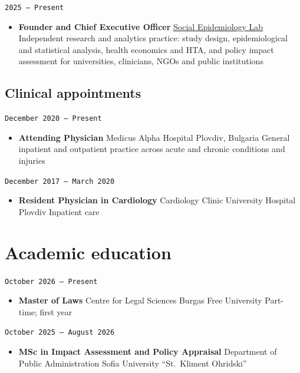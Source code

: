 \documentclass[
  10.5pt,
  a4paper,
  DIV=11,
  numbers=noendperiod]{scrartcl}
\providecommand{\tightlist}{%
  \setlength{\itemsep}{0pt}\setlength{\parskip}{0pt}}
\let\oldtexttt\texttt
\renewcommand{\texttt}[1]{{\color{cvbronze}\small\oldtexttt{#1}}}
\begin{document}
\texttt{2025\ –\ Present}

\begin{itemize}
\tightlist
\item
  \textbf{Founder and Chief Executive Officer} \textbar{}
  \href{lab.qmd}{Social Epidemiology Lab} \textbar{} Independent
  research and analytics practice: study design, epidemiological and
  statistical analysis, health economics and HTA, and policy impact
  assessment for universities, clinicians, NGOs and public institutions
\end{itemize}

\subsection{Clinical appointments}\label{clinical-appointments}

\texttt{December\ 2020\ –\ Present}

\begin{itemize}
\tightlist
\item
  \textbf{Attending Physician} \textbar{} Medicus Alpha Hospital
  \textbar{} Plovdiv, Bulgaria \textbar{} General inpatient and
  outpatient practice across acute and chronic conditions and injuries
\end{itemize}

\texttt{December\ 2017\ –\ March\ 2020}

\begin{itemize}
\tightlist
\item
  \textbf{Resident Physician in Cardiology} \textbar{} Cardiology Clinic
  \textbar{} University Hospital Plovdiv \textbar{} Inpatient care
\end{itemize}

\section{Academic education}\label{academic-education}

\texttt{October\ 2026\ –\ Present}

\begin{itemize}
\tightlist
\item
  \textbf{Master of Laws} \textbar{} Centre for Legal Sciences
  \textbar{} Burgas Free University \textbar{} Part-time; first year
\end{itemize}

\texttt{October\ 2025\ –\ August\ 2026}

\begin{itemize}
\tightlist
\item
  \textbf{MSc in Impact Assessment and Policy Appraisal} \textbar{}
  Department of Public Administration \textbar{} Sofia University
  ``St.~Kliment Ohridski''
\end{itemize}
\end{document}
